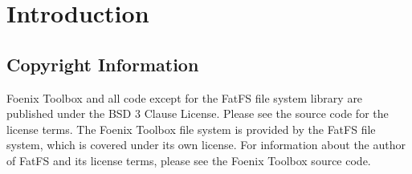 \chapter{Introduction}

\section*{Copyright Information}
Foenix Toolbox and all code except for the FatFS file system library are published under the BSD 3 Clause License. Please see the source code for the license terms. The Foenix Toolbox file system is provided by the FatFS file system, which is covered under its own license. For information about the author of FatFS and its license terms, please see the Foenix Toolbox source code.
